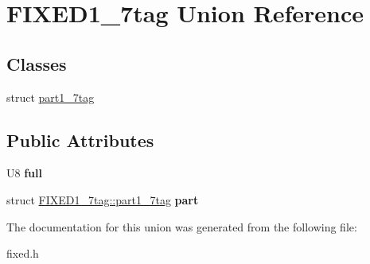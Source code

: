 \hypertarget{union_f_i_x_e_d1__7tag}{
\section{FIXED1\_\-7tag Union Reference}
\label{union_f_i_x_e_d1__7tag}
}
\subsection*{Classes}
\begin{DoxyCompactItemize}
\item 
struct \hyperlink{struct_f_i_x_e_d1__7tag_1_1part1__7tag}{part1\_\-7tag}
\end{DoxyCompactItemize}
\subsection*{Public Attributes}
\begin{DoxyCompactItemize}
\item 
\hypertarget{union_f_i_x_e_d1__7tag_a96daa1d831c405cdfb16fc1440daeb36}{
U8 {\bfseries full}}
\label{union_f_i_x_e_d1__7tag_a96daa1d831c405cdfb16fc1440daeb36}

\item 
\hypertarget{union_f_i_x_e_d1__7tag_aea806520b77d181d2d988c0bc4448e9c}{
struct \hyperlink{struct_f_i_x_e_d1__7tag_1_1part1__7tag}{FIXED1\_\-7tag::part1\_\-7tag} {\bfseries part}}
\label{union_f_i_x_e_d1__7tag_aea806520b77d181d2d988c0bc4448e9c}

\end{DoxyCompactItemize}


The documentation for this union was generated from the following file:\begin{DoxyCompactItemize}
\item 
fixed.h\end{DoxyCompactItemize}
